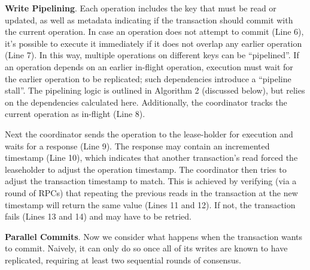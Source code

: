 \documentclass[11pt]{article}
\begin{document}
\textbf{Write Pipelining}. Each operation includes the key that must be read or updated, as well as metadata
indicating if the transaction should commit with the current operation. In case an operation does not
attempt to commit (Line 6), it's possible to execute it immediately if it does not overlap any earlier
operation (Line 7). In this way, multiple operations on different keys can be ``pipelined''. If an
operation depends on an earlier in-flight operation, execution must wait for the earlier operation to
be replicated; such dependencies introduce a ``pipeline stall''. The pipelining logic is outlined in
Algorithm 2 (discussed below), but relies on the dependencies calculated here. Additionally, the
coordinator tracks the current operation as in-flight (Line 8).

Next the coordinator sends the operation to the lease-holder for execution and waits for a response
(Line 9). The response may contain an incremented timestamp (Line 10), which indicates that another
transaction's read forced the leaseholder to adjust the operation timestamp. The coordinator then
tries to adjust the transaction timestamp to match. This is achieved by verifying (via a round of
RPCs) that repeating the previous reads in the transaction at the new timestamp will return the same
value (Lines 11 and 12). If not, the transaction fails (Lines 13 and 14) and may have to be retried.

\textbf{Parallel Commits}. Now we consider what happens when the transaction wants to commit. Naively, it can
only do so once all of its writes are known to have replicated, requiring at least two sequential
rounds of consensus.
\end{document}
